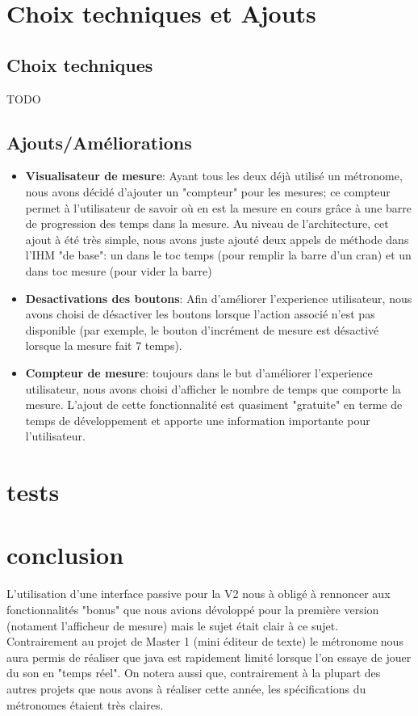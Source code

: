 \documentclass{article}
\begin{document}
\section{Choix techniques et Ajouts}
\subsection{Choix techniques}
TODO


\subsection{Ajouts/Améliorations}
\begin{itemize}
\item \textbf{Visualisateur de mesure}: Ayant tous les deux déjà utilisé un métronome, nous avons décidé d'ajouter un "compteur" pour les mesures; ce compteur permet à l'utilisateur de savoir où en est la mesure en cours grâce à une barre de progression des temps dans la mesure. Au niveau de l'architecture, cet ajout à été très simple, nous avons juste ajouté deux appels de méthode dans l'IHM "de base": un dans le toc temps (pour remplir la barre d'un cran) et un dans toc mesure (pour vider la barre)
\item \textbf{Desactivations des boutons}: Afin d'améliorer l'experience utilisateur, nous avons choisi de désactiver les boutons lorsque l'action associé n'est pas disponible (par exemple, le bouton d'incrément de mesure est désactivé lorsque la mesure fait 7 temps).
\item \textbf{Compteur de mesure}: toujours dans le but d'améliorer l'experience utilisateur, nous avons choisi d'afficher le nombre de temps que comporte la mesure. L'ajout de cette fonctionnalité est quasiment "gratuite" en terme de temps de développement et apporte une information importante pour l'utilisateur.
\end{itemize}

\section{tests}


\section{conclusion}
L'utilisation d'une interface passive pour la V2 nous à obligé à rennoncer aux fonctionnalités "bonus" que nous avions dévoloppé pour la première version (notament l'afficheur de mesure) mais le sujet était clair à ce sujet.
Contrairement au projet de Master 1 (mini éditeur de texte) le métronome nous aura permis de réaliser que java est rapidement limité lorsque l'on essaye de jouer du son en "temps réel". On notera aussi que, contrairement à la plupart des autres projets que nous avons à réaliser cette année, les spécifications du métronomes étaient très claires.
\end{document}
